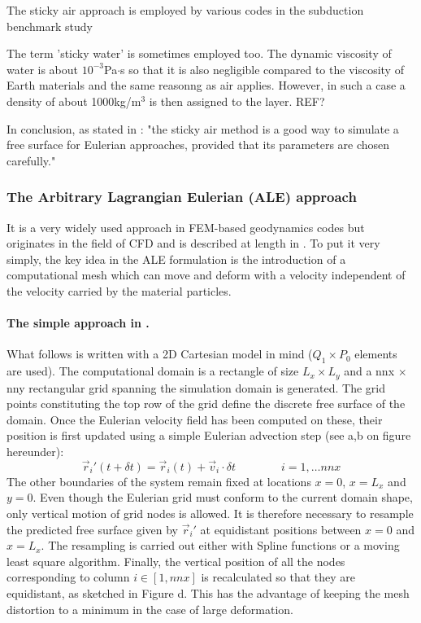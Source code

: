 The sticky air approach is employed by various codes in the subduction benchmark study \cite{scbe08}

The term 'sticky water' is sometimes employed too. The dynamic viscosity of water is about 
$10^{-3}$Pa$\cdot$s so that it is also negligible compared to the viscosity of Earth materials
and the same reasonng as air applies. However, in such a case a density of about 1000kg/m$^3$ 
is then assigned to the layer. REF?

In conclusion, as stated in \cite{crsg12}: "the sticky air method is a good way to
simulate a free surface for Eulerian approaches, provided that its
parameters are chosen carefully."


\subsubsection{The Arbitrary Lagrangian Eulerian (ALE) approach}
 

It is a very widely used approach in FEM-based geodynamics codes but originates in the field of 
CFD \cite{hiac74,hulz81} and is described at length in \cite{sozo01,dohp04,dohu03}.
To put it very simply, the key idea in the ALE formulation is
the introduction of a computational mesh which can move and deform with a velocity 
independent of the velocity carried by the material particles.

\paragraph{The simple approach in \cite{thie11}.}
What follows is written with a 2D Cartesian model in mind ($Q_1\times P_0$ elements are used).
The computational domain is a rectangle of size $L_x \times  L_y$ 
and a nnx $\times$ nny rectangular grid spanning the simulation
domain is generated.
The grid points constituting the top row of the grid define the
discrete free surface of the domain. Once the Eulerian velocity field
has been computed on these, their position is first updated using a
simple Eulerian advection step (see a,b on figure hereunder):
\[
\vec{r}_i'(t+\delta t) = \vec{r}_i(t) + \vec{v}_i \cdot \delta t
\qquad\qquad
i=1,\dots nnx
\]
The other boundaries of the system remain fixed at locations
$x=0$, $x=L_x$ and $y=0$. Even though the Eulerian grid must conform
to the current domain shape, only vertical motion of grid nodes is
allowed. It is therefore necessary to resample the predicted free
surface given by $\vec{r}_i'$ at equidistant positions between $x=0$ and $x=L_x$.
The resampling is carried out either with Spline functions or a 
moving least square algorithm. 
Finally, the vertical position of all the nodes corresponding
to column $i\in [1,nnx]$ is recalculated so that they are equidistant, 
as sketched in Figure d. This has the advantage of keeping
the mesh distortion to a minimum in the case of large
deformation.

